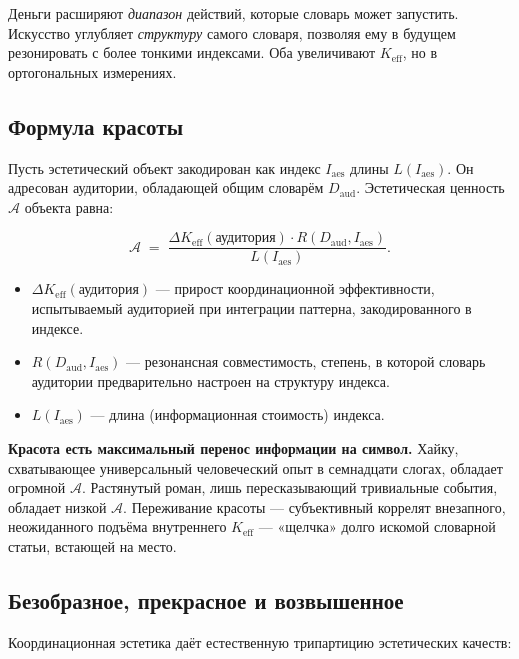 \documentclass[12pt,a4paper]{article}
\begin{document}
	Деньги расширяют \emph{диапазон} действий, которые словарь может запустить. Искусство углубляет \emph{структуру} самого словаря, позволяя ему в будущем резонировать с более тонкими индексами. Оба увеличивают \(K_{\mathrm{eff}}\), но в ортогональных измерениях.
	
	\subsection{Формула красоты}
	
	Пусть эстетический объект закодирован как индекс \(I_{\mathrm{aes}}\) длины \(L(I_{\mathrm{aes}})\). Он адресован аудитории, обладающей общим словарём \(D_{\mathrm{aud}}\). Эстетическая ценность \(\mathcal{A}\) объекта равна:
	
	\[
	\mathcal{A} \; = \; \frac{\Delta K_{\mathrm{eff}}(\text{аудитория}) \cdot R(D_{\mathrm{aud}}, I_{\mathrm{aes}})}{L(I_{\mathrm{aes}})}.
	\]
	
	\begin{itemize}[leftmargin=*]
		\item \(\Delta K_{\mathrm{eff}}(\text{аудитория})\) — прирост координационной эффективности, испытываемый аудиторией при интеграции паттерна, закодированного в индексе.
		\item \(R(D_{\mathrm{aud}}, I_{\mathrm{aes}})\) — резонансная совместимость, степень, в которой словарь аудитории предварительно настроен на структуру индекса.
		\item \(L(I_{\mathrm{aes}})\) — длина (информационная стоимость) индекса.
	\end{itemize}
	
	\textbf{Красота есть максимальный перенос информации на символ.} Хайку, схватывающее универсальный человеческий опыт в семнадцати слогах, обладает огромной \(\mathcal{A}\). Растянутый роман, лишь пересказывающий тривиальные события, обладает низкой \(\mathcal{A}\). Переживание красоты — субъективный коррелят внезапного, неожиданного подъёма внутреннего \(K_{\mathrm{eff}}\) — «щелчка» долго искомой словарной статьи, встающей на место.
	
	\subsection{Безобразное, прекрасное и возвышенное}
	
	Координационная эстетика даёт естественную трипартицию эстетических качеств:
	
\end{document}
